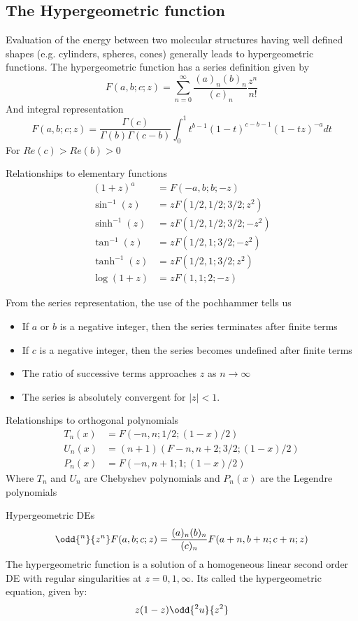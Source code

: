 \documentclass{X:/Documents/Coding/Latex/myassignment}
\begin{document}
\subsection{The Hypergeometric function}
Evaluation of the energy between two molecular structures having well defined shapes (e.g. cylinders, spheres, cones) generally leads to hypergeometric functions. The hypergeometric function has a series definition given by
\[F(a,b;c;z) = \sum_{n=0}^\infty \frac{(a)_n (b)_n}{(c)_n} \frac{z^n}{n!}\]
And integral representation
\[F(a,b;c;z) = \frac{\Gamma(c)}{\Gamma(b)\Gamma(c-b)} \int_0^1 t^{b-1}(1-t)^{c-b-1}(1-tz)^{-a} dt\]
For $Re(c) > Re(b) > 0$

Relationships to elementary functions
\begin{align*}
	(1+z)^a &= F(-a,b;b;-z)\\
	\sin^{-1}(z) &= zF(1/2,1/2;3/2;z^2)\\
	\sinh^{-1}(z) &= zF(1/2,1/2;3/2;-z^2)\\
	\tan^{-1}(z) &= zF(1/2,1;3/2;-z^2)\\
	\tanh^{-1}(z) &= zF(1/2,1;3/2;z^2)\\
	\log(1+z) &= zF(1,1;2;-z)
\end{align*}

From the series representation, the use of the pochhammer tells us
\begin{itemize}
	\item If $a$ or $b$ is a negative integer, then the series terminates after finite terms
	\item If $c$ is a negative integer, then the series becomes undefined after finite terms
	\item The ratio of successive terms approaches $z$ as $n\to\infty$
	\item The series is absolutely convergent for $|z| <1$.
\end{itemize}


Relationships to orthogonal polynomials
\begin{align*}
	T_n(x) &= F(-n,n;1/2;(1-x)/2)\\
	U_n(x) &= (n+1)(F-n,n+2;3/2;(1-x)/2)\\
	P_n(x) &= F(-n,n+1;1;(1-x)/2)
\end{align*}
Where $T_n$ and $U_n$ are Chebyshev polynomials and $P_n(x)$ are the Legendre polynomials


Hypergeometric DEs 
\[\odd{^n}{z^n} F(a,b;c;z) = \frac{(a)_n (b)_n}{(c)_n} F(a+n,b+n;c+n;z)\]
The hypergeometric function is a solution of a homogeneous linear second order DE with regular singularities at $z=0,1,\infty$. Its called the hypergeometric equation, given by:
\[z(1-z) \odd{^2u}{z^2}\]
\end{document}
